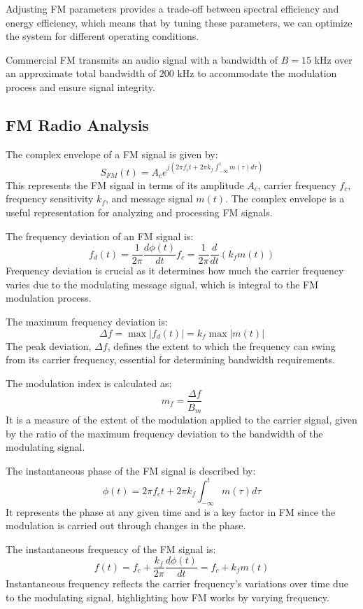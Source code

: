 Adjusting FM parameters provides a trade-off between spectral efficiency and energy efficiency, which means that by tuning these parameters, we can optimize the system for different operating conditions.

Commercial FM transmits an audio signal with a bandwidth of \( B = 15 \) kHz over an approximate total bandwidth of \( 200 \) kHz to accommodate the modulation process and ensure signal integrity.

\subsection*{FM Radio Analysis}
The complex envelope of a FM signal is given by:
\[ S_{FM}(t) = A_c e^{j\left(2\pi f_c t + 2\pi k_f \int_{-\infty}^{t} m(\tau) d\tau\right)} \]
This represents the FM signal in terms of its amplitude \( A_c \), carrier frequency \( f_c \), frequency sensitivity \( k_f \), and message signal \( m(t) \). The complex envelope is a useful representation for analyzing and processing FM signals.

The frequency deviation of an FM signal is:
\[ f_d(t) = \frac{1}{2\pi} \frac{d \phi(t)}{dt} f_c = \frac{1}{2\pi} \frac{d}{dt}\left(k_f m(t)\right) \]
Frequency deviation is crucial as it determines how much the carrier frequency varies due to the modulating message signal, which is integral to the FM modulation process.

The maximum frequency deviation is:
\[ \Delta f = \max |f_d(t)| = k_f \max |m(t)| \]
The peak deviation, \( \Delta f \), defines the extent to which the frequency can swing from its carrier frequency, essential for determining bandwidth requirements.

The modulation index is calculated as:
\[ m_f = \frac{\Delta f}{B_m} \]
It is a measure of the extent of the modulation applied to the carrier signal, given by the ratio of the maximum frequency deviation to the bandwidth of the modulating signal.

The instantaneous phase of the FM signal is described by:
\[ \phi(t) = 2\pi f_c t + 2\pi k_f \int_{-\infty}^{t} m(\tau) d\tau \]
It represents the phase at any given time and is a key factor in FM since the modulation is carried out through changes in the phase.

The instantaneous frequency of the FM signal is:
\[ f(t) = f_c + \frac{k_f}{2\pi} \frac{d\phi(t)}{dt} = f_c + k_f m(t) \]
Instantaneous frequency reflects the carrier frequency's variations over time due to the modulating signal, highlighting how FM works by varying frequency.

